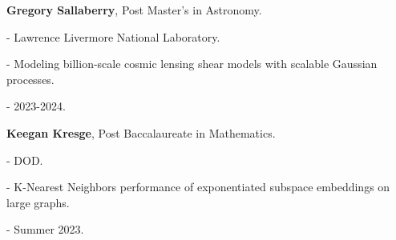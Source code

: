 \begin{innerlist}

  \item[] \textbf{Gregory Sallaberry},
  Post Master's in Astronomy.
  \begin{innerlist}
    \item[-] Lawrence Livermore National Laboratory.
    \item[-] Modeling billion-scale cosmic lensing shear models with scalable Gaussian processes.
    \item[-] 2023-2024.
  \end{innerlist}

  \item[] \textbf{Keegan Kresge},
  Post Baccalaureate in Mathematics.
  \begin{innerlist}
    \item[-] DOD.
    \item[-] K-Nearest Neighbors performance of exponentiated subspace embeddings on large graphs.
    \item[-] Summer 2023.
  \end{innerlist}

\end{innerlist}
